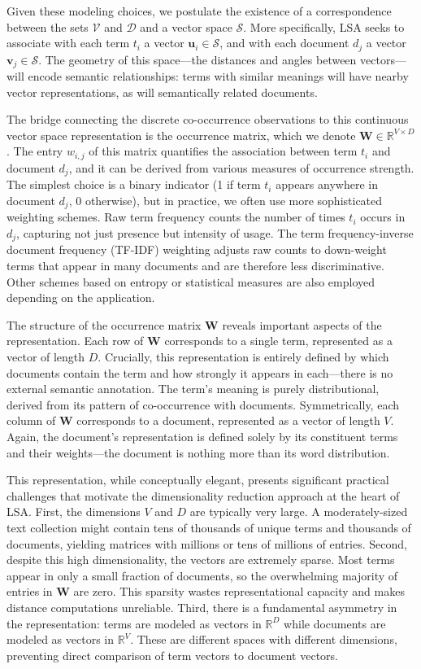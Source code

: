 Given these modeling choices, we postulate the existence of a correspondence between the sets $\mathcal{V}$ and $\mathcal{D}$ and a vector space $\mathcal{S}$. More specifically, LSA seeks to associate with each term $t_i$ a vector $\mathbf{u}_i \in \mathcal{S}$, and with each document $d_j$ a vector $\mathbf{v}_j \in \mathcal{S}$. The geometry of this space—the distances and angles between vectors—will encode semantic relationships: terms with similar meanings will have nearby vector representations, as will semantically related documents.

The bridge connecting the discrete co-occurrence observations to this continuous vector space representation is the occurrence matrix, which we denote $\mathbf{W} \in \mathbb{R}^{V \times D}$. The entry $w_{i,j}$ of this matrix quantifies the association between term $t_i$ and document $d_j$, and it can be derived from various measures of occurrence strength. The simplest choice is a binary indicator (1 if term $t_i$ appears anywhere in document $d_j$, 0 otherwise), but in practice, we often use more sophisticated weighting schemes. Raw term frequency counts the number of times $t_i$ occurs in $d_j$, capturing not just presence but intensity of usage. The term frequency-inverse document frequency (TF-IDF) weighting adjusts raw counts to down-weight terms that appear in many documents and are therefore less discriminative. Other schemes based on entropy or statistical measures are also employed depending on the application.

The structure of the occurrence matrix $\mathbf{W}$ reveals important aspects of the representation. Each row of $\mathbf{W}$ corresponds to a single term, represented as a vector of length $D$. Crucially, this representation is entirely defined by which documents contain the term and how strongly it appears in each—there is no external semantic annotation. The term's meaning is purely distributional, derived from its pattern of co-occurrence with documents. Symmetrically, each column of $\mathbf{W}$ corresponds to a document, represented as a vector of length $V$. Again, the document's representation is defined solely by its constituent terms and their weights—the document is nothing more than its word distribution.

This representation, while conceptually elegant, presents significant practical challenges that motivate the dimensionality reduction approach at the heart of LSA. First, the dimensions $V$ and $D$ are typically very large. A moderately-sized text collection might contain tens of thousands of unique terms and thousands of documents, yielding matrices with millions or tens of millions of entries. Second, despite this high dimensionality, the vectors are extremely sparse. Most terms appear in only a small fraction of documents, so the overwhelming majority of entries in $\mathbf{W}$ are zero. This sparsity wastes representational capacity and makes distance computations unreliable. Third, there is a fundamental asymmetry in the representation: terms are modeled as vectors in $\mathbb{R}^D$ while documents are modeled as vectors in $\mathbb{R}^V$. These are different spaces with different dimensions, preventing direct comparison of term vectors to document vectors.

